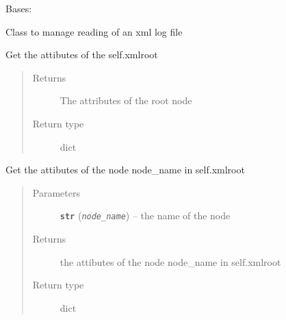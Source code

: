 \documentclass[a4paper,10pt,english]{sphinxmanual}
\begin{document}
\begin{fulllineitems}
\label{commands/apidoc/src:src.xmlManager.ReadXmlFile}
Bases: 

Class to manage reading of an xml log file

\begin{fulllineitems}
\label{commands/apidoc/src:src.xmlManager.ReadXmlFile.getRootAttrib}
Get the attibutes of the self.xmlroot
\begin{quote}\begin{description}
\item[{Returns}] \leavevmode
The attributes of the root node

\item[{Return type}] \leavevmode
dict

\end{description}\end{quote}

\end{fulllineitems}


\begin{fulllineitems}
\label{commands/apidoc/src:src.xmlManager.ReadXmlFile.get_attrib}
Get the attibutes of the node node\_name in self.xmlroot
\begin{quote}\begin{description}
\item[{Parameters}] \leavevmode
\textbf{\texttt{str}} (\emph{\texttt{node\_name}}) -- the name of the node

\item[{Returns}] \leavevmode
the attibutes of the node node\_name in self.xmlroot

\item[{Return type}] \leavevmode
dict

\end{description}\end{quote}

\end{fulllineitems}



\end{fulllineitems}
\end{document}

